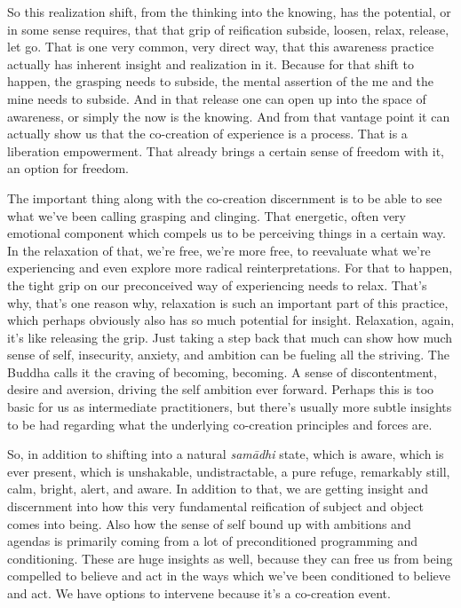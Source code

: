 \documentclass[12pt,openany]{book}
\begin{document}
So this realization shift, from the thinking into the knowing, has the potential, or in some sense requires, that that grip of reification subside, loosen, relax, release, let go. That is one very common, very direct way, that this awareness practice actually has inherent insight and realization in it. Because for that shift to happen, the grasping needs to subside, the mental assertion of the me and the mine needs to subside. And in that release one can open up into the space of awareness, or simply the now is the knowing. And from that vantage point it can actually show us that the co-creation of experience is a process. That is a liberation empowerment. That already brings a certain sense of freedom with it, an option for freedom. 

The important thing along with the  co-creation discernment is to be able to see what we've been calling grasping and clinging. That energetic, often very emotional component which compels us to be perceiving things in a certain way. In the relaxation of that, we're free, we’re more free, to reevaluate what we're experiencing and even explore more radical reinterpretations. For that to happen, the tight grip on our preconceived way of experiencing needs to relax. That's why, that's one reason why, relaxation is such an important part of this practice, which perhaps obviously also has so much potential for insight. Relaxation, again, it's like releasing the grip. Just taking a step back that much can show how much sense of self, insecurity, anxiety, and ambition can be fueling all the striving. The Buddha calls it the craving of becoming, becoming. A sense of discontentment, desire and aversion, driving the self ambition ever forward. Perhaps this is too basic for us as intermediate practitioners, but there's usually more subtle insights to be had regarding what the underlying co-creation principles and forces are.

So, in addition to shifting into a natural \textit{samādhi} state, which is aware, which is ever present, which is unshakable, undistrac\-ta\-ble, a pure refuge, remarkably still, calm, bright, alert, and aware. In addition to that, we are getting insight and discernment into how this very fundamental reification of subject and object comes into being. Also how the sense of self bound up with ambitions and agendas is primarily coming from a lot of preconditioned programming and conditioning. These are huge insights as well, because they can free us from being compelled to believe and act in the ways which we've been conditioned to believe and act. We have options to intervene because it's a co-creation event.
\end{document}
